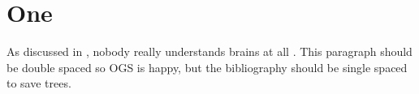 \documentclass{ucsd}
\begin{document}
\chapter{One} 
As discussed in \citet{Martin_1983}, nobody really understands brains at all \citep{Rilling_Insel_1999}. This paragraph should be double spaced so OGS is happy, but the bibliography should be single spaced to save trees.

\def\baselinestretch{1.0}\normalfont %

\def\baselinestretch{1.5}\normalfont %
 
\end{document}
